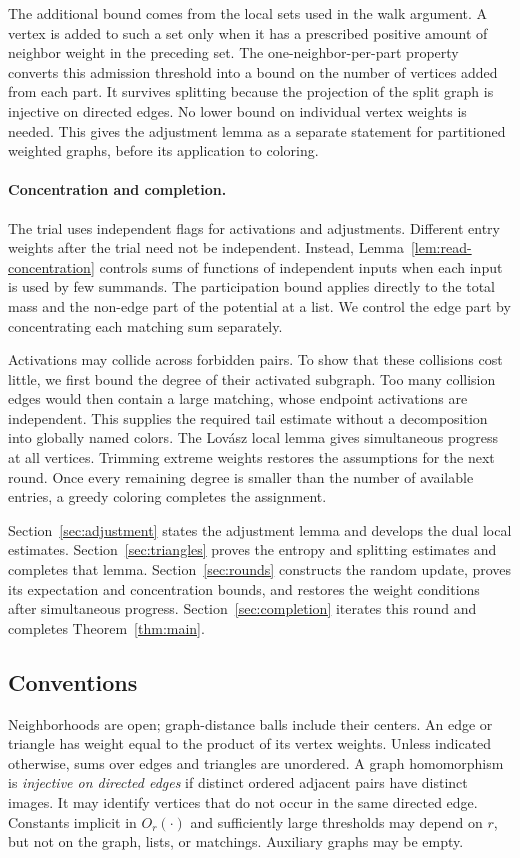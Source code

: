The additional bound comes from the local sets used in the walk
argument. A vertex is added to such a set only when it has a prescribed
positive amount of neighbor weight in the preceding set. The
one-neighbor-per-part property converts this admission threshold into
a bound on the number of vertices added from each part. It survives
splitting because the projection of the split graph is injective on
directed edges. No lower bound on individual vertex weights is needed.
This gives the adjustment lemma as a separate statement for partitioned
weighted graphs, before its application to coloring.

\paragraph{Concentration and completion.}
The trial uses independent flags for activations and adjustments.
Different entry weights after the trial need not be independent.
Instead, Lemma~\ref{lem:read-concentration} controls sums of functions
of independent inputs when each input is used by few summands. The
participation bound applies directly to the total mass and the
non-edge part of the potential at a list. We control the edge part by
concentrating each matching sum separately.

Activations may collide across forbidden pairs. To show that these
collisions cost little, we first bound the degree of their activated
subgraph. Too many collision edges would then contain a large matching,
whose endpoint activations are independent. This supplies the required
tail estimate without a decomposition into globally named colors.
The Lov\'asz local lemma gives simultaneous progress at all vertices.
Trimming extreme weights restores the assumptions for the next round.
Once every remaining degree is smaller than the number of available
entries, a greedy coloring completes the assignment.

Section~\ref{sec:adjustment} states the adjustment lemma and develops
the dual local estimates. Section~\ref{sec:triangles} proves the
entropy and splitting estimates and completes that lemma.
Section~\ref{sec:rounds} constructs the random update, proves its
expectation and concentration bounds, and restores the weight conditions
after simultaneous progress. Section~\ref{sec:completion} iterates this
round and completes Theorem~\ref{thm:main}.

\subsection{Conventions}
Neighborhoods are open; graph-distance balls include their centers.
An edge or triangle has weight equal to the product of its vertex
weights. Unless indicated otherwise, sums over edges and triangles are
unordered. A graph homomorphism is \emph{injective on directed edges}
if distinct ordered adjacent pairs have distinct images. It may
identify vertices that do not occur in the same directed edge.
Constants implicit in $O_r(\cdot)$ and sufficiently large thresholds
may depend on $r$, but not on the graph, lists, or matchings. Auxiliary
graphs may be empty.
